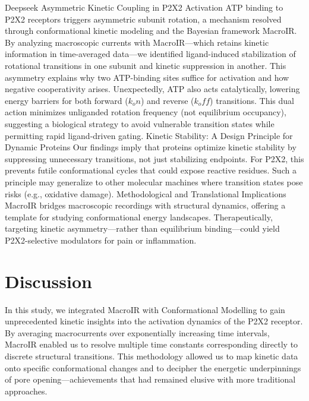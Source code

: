 \documentclass[a4paper,12pt]{article}
\begin{document}
	Deepseek
	Asymmetric Kinetic Coupling in P2X2 Activation
	ATP binding to P2X2 receptors triggers asymmetric subunit rotation, a mechanism resolved through conformational kinetic modeling and the Bayesian framework MacroIR. By analyzing macroscopic currents with MacroIR—which retains kinetic information in time-averaged data—we identified ligand-induced stabilization of rotational transitions in one subunit and kinetic suppression in another. This asymmetry explains why two ATP-binding sites suffice for activation and how negative cooperativity arises. Unexpectedly, ATP also acts catalytically, lowering energy barriers for both forward ($k_on$) and reverse ($k_off$) transitions. This dual action minimizes unliganded rotation frequency (not equilibrium occupancy), suggesting a biological strategy to avoid vulnerable transition states while permitting rapid ligand-driven gating.
	Kinetic Stability: A Design Principle for Dynamic Proteins
	Our findings imply that proteins optimize kinetic stability by suppressing unnecessary transitions, not just stabilizing endpoints. For P2X2, this prevents futile conformational cycles that could expose reactive residues. Such a principle may generalize to other molecular machines where transition states pose risks (e.g., oxidative damage).
	Methodological and Translational Implications
	MacroIR bridges macroscopic recordings with structural dynamics, offering a template for studying conformational energy landscapes. Therapeutically, targeting kinetic asymmetry—rather than equilibrium binding—could yield P2X2-selective modulators for pain or inflammation.
	\section*{Discussion}
	In this study, we integrated MacroIR with Conformational Modelling to gain unprecedented kinetic insights into the activation dynamics of the P2X2 receptor. By averaging macrocurrents over exponentially increasing time intervals, MacroIR enabled us to resolve multiple time constants corresponding directly to discrete structural transitions. This methodology allowed us to map kinetic data onto specific conformational changes and to decipher the energetic underpinnings of pore opening—achievements that had remained elusive with more traditional approaches.
	
\end{document}
